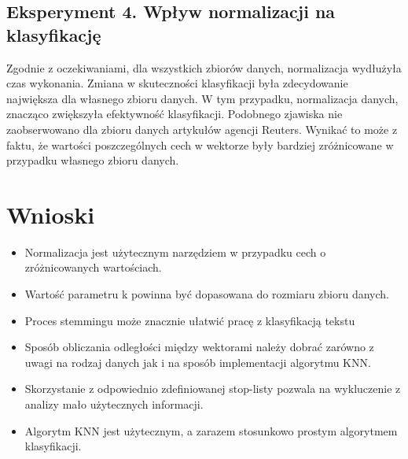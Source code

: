 \documentclass{classrep}
\begin{document}
\subsection{Eksperyment 4. Wpływ normalizacji na klasyfikację}
Zgodnie z oczekiwaniami, dla wszystkich zbiorów danych, normalizacja wydłużyła czas wykonania. Zmiana w skuteczności klasyfikacji była zdecydowanie największa dla własnego zbioru danych. W tym przypadku, normalizacja danych, znacząco zwiększyła efektywność klasyfikacji. Podobnego zjawiska nie zaobserwowano dla zbioru danych artykułów agencji Reuters. Wynikać to może z faktu, że wartości poszczególnych cech w wektorze były bardziej zróżnicowane w przypadku własnego zbioru danych.

\newpage
\section{Wnioski}
\begin{itemize}
	\item Normalizacja jest użytecznym narzędziem w przypadku cech o zróżnicowanych wartościach.
	\item Wartość parametru k powinna być dopasowana do rozmiaru zbioru danych.

	\item Proces stemmingu może znacznie ułatwić pracę z klasyfikacją tekstu
	\item Sposób obliczania odległości między wektorami należy dobrać zarówno z uwagi na rodzaj danych jak i na sposób implementacji algorytmu KNN.
	\item Skorzystanie z odpowiednio zdefiniowanej stop-listy pozwala na wykluczenie z analizy mało użytecznych informacji.
	\item Algorytm KNN jest użytecznym, a zarazem stosunkowo prostym algorytmem klasyfikacji.
\end{itemize}
\end{document}
